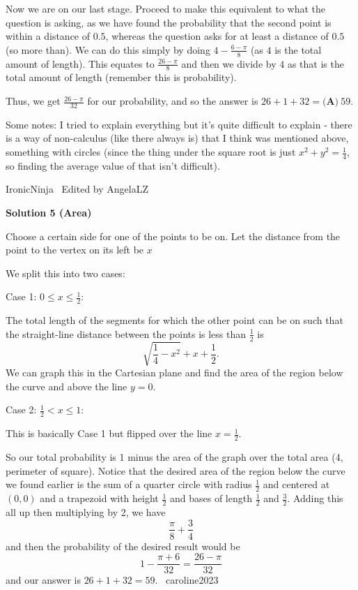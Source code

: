 \begin{enumerate}
 Now we are on our last stage. Proceed to make this equivalent to what the question is asking, as we have found the probability that the second point is within a distance of $0.5$, whereas the question asks for at least a distance of $0.5$ (so more than). We can do this simply by doing $4- \frac{6-\pi}{8}$ (as $4$ is the total amount of length). This equates to $\frac{26-\pi}{8}$ and then we divide by $4$ as that is the total amount of length (remember this is probability). 

 Thus, we get $\frac{26-\pi}{32}$ for our probability, and so the answer is $26 + 1 + 32 = \textbf{(A)}\ 59$.

 Some notes: I tried to explain everything but it's quite difficult to explain - there is a way of non-calculus (like there always is) that I think was mentioned above, something with circles (since the thing under the square root is just $x^2+y^2 = \frac{1}{4}$, so finding the average value of that isn't difficult). 

 IronicNinja~ Edited by AngelaLZ~

 



\textbf{Solution 5 (Area)}

Choose a certain side for one of the points to be on. Let the distance from the point to the vertex on its left be $x$

 We split this into two cases: 

 Case 1: $0\leq x\leq \frac12$:

 The total length of the segments for which the other point can be on such that the straight-line distance between the points is less than $\frac12$ is 
 \[\sqrt{\frac14-x^2}+x+\frac12.\] We can graph this in the Cartesian plane and find the area of the region below the curve and above the line $y=0$.

 Case 2: $\frac12< x\leq 1$:

 This is basically Case 1 but flipped over the line $x=\frac12$.

 So our total probability is 1 minus the area of the graph over the total area (4, perimeter of square). Notice that the desired area of the region below the curve we found earlier is the sum of a quarter circle with radius $\frac12$ and centered at $(0,0)$ and a trapezoid with height $\frac12$ and bases of length $\frac12$ and $\frac32$. Adding this all up then multiplying by 2, we have 
 \[\frac{\pi}{8}+\frac34\] and then the probability of the desired result would be 
 \[1-\frac{\pi+6}{32}=\frac{26-\pi}{32}\] and our answer is $26+1+32=\boxed{59}$. ~caroline2023


\end{enumerate}

